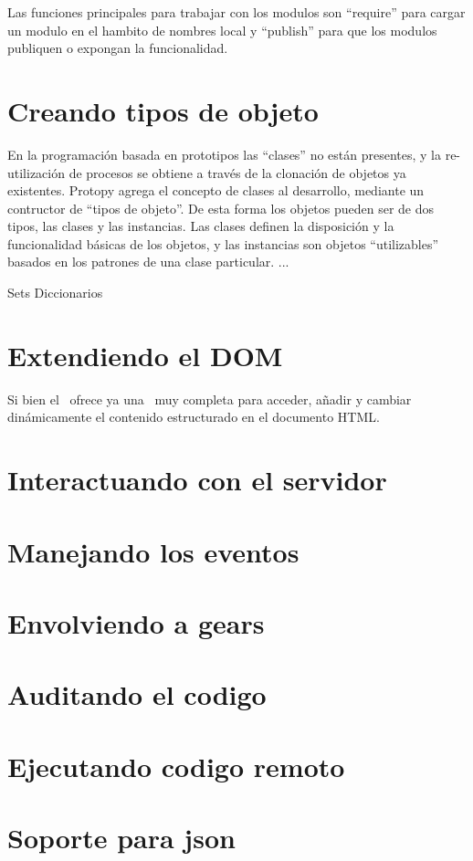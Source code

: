 Las funciones principales para trabajar con los modulos son ``require'' para
cargar un modulo en el hambito de nombres local y ``publish'' para que los
modulos publiquen o expongan la funcionalidad.

\section{Creando tipos de objeto}
En la programación basada en prototipos las ``clases'' no están presentes, y la
re-utilización de procesos se obtiene a través de la clonación de objetos ya
existentes. 
Protopy agrega el concepto de clases al desarrollo, mediante un contructor de
``tipos de objeto''. De esta forma los objetos pueden ser de dos tipos, las
clases y las instancias. Las clases definen la disposición y la funcionalidad
básicas de los objetos, y las instancias son objetos ``utilizables'' basados en
los patrones de una clase particular.
...

Sets
Diccionarios

%   
%   
%   

\section{Extendiendo el DOM}
Si bien el \DOM\ ofrece ya una \API\ muy completa para acceder, añadir y cambiar
dinámicamente el contenido estructurado en el documento HTML.

\section{Interactuando con el servidor}

\section{Manejando los eventos}

\section{Envolviendo a gears}

\section{Auditando el codigo}

\section{Ejecutando codigo remoto}

\section{Soporte para json}